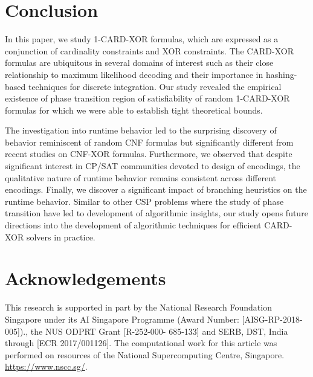 \section{Conclusion}\label{sec:conclusion}
In this paper, we study 1-CARD-XOR formulas, which are expressed as a conjunction of cardinality constraints and XOR constraints. The CARD-XOR formulas are ubiquitous in several domains of interest such as their close relationship to maximum likelihood decoding and their importance in hashing-based techniques for discrete integration. Our study revealed the empirical existence of phase transition region of satisfiability of random 1-CARD-XOR formulas for which we were able to establish tight theoretical bounds. 

The investigation into runtime behavior led to the surprising discovery of behavior reminiscent of random CNF formulas but significantly different from recent studies on CNF-XOR formulas. Furthermore, we observed that despite significant interest in CP/SAT communities devoted to design of encodings, the qualitative nature of runtime behavior remains consistent across different encodings. Finally, we discover a significant impact of branching heuristics on the runtime behavior. Similar to other CSP problems where the study of phase transition have led to development of algorithmic insights, our study opens future directions into the development of algorithmic techniques for efficient CARD-XOR solvers in practice. 
\section*{Acknowledgements}
This research is supported in part by the National Research Foundation Singapore under its AI Singapore Programme (Award Number: [AISG-RP-2018-005])., the NUS ODPRT Grant [R-252-000-
685-133] and SERB, DST, India through [ECR 2017/001126]. The computational work for this article was performed
on resources of the National Supercomputing Centre, Singapore. \url{https://www.nscc.sg/}.
